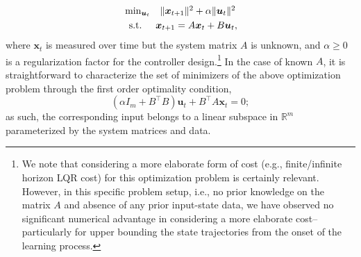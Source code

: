 \documentclass[journal]{IEEEtran}
\theoremstyle{definition}
\theoremstyle{remark}
\newcommand\x{{\bm x}}
\def\u{{\bm u}}
\begin{document}
\begin{equation}
	\begin{aligned}	\label{eqn:optimization}
    	&\textstyle \min_{\u_t} \hspace{3mm} \|\x_{t+1}\|^2 + \alpha \|\u_t\|^2  \\
    	&\hspace{2mm} \text{s.t.} \hspace{5mm} \x_{t+1} = A \x_t + B \u_t,
	\end{aligned}
\end{equation}
where $\x_t$ is measured over time but the system matrix $A$ is unknown, and $\alpha \geq 0$ is a regularization factor for the controller design.\footnote{\color{Blue} We note that considering a more elaborate form of cost (e.g., finite/infinite horizon \ac{LQR} cost) for this optimization problem is certainly relevant. However, in this specific problem setup, i.e., no prior knowledge on the matrix $A$ and absence of any prior input-state data, we have observed no significant numerical advantage in considering a more elaborate cost--particularly for upper bounding the state trajectories from the onset of the learning process.}
%
%
In the case of known $A$, it is straightforward to characterize the set of minimizers of the above optimization problem through the first order optimality condition,
\begin{equation*}
	(\alpha I_m + B^\intercal B) \u_t + B^\intercal A \x_t = 0;
\end{equation*}
as such, the corresponding input belongs to a linear subspace in $\mathbb{R}^m$ parameterized by the system matrices and data.
%
\end{document}
